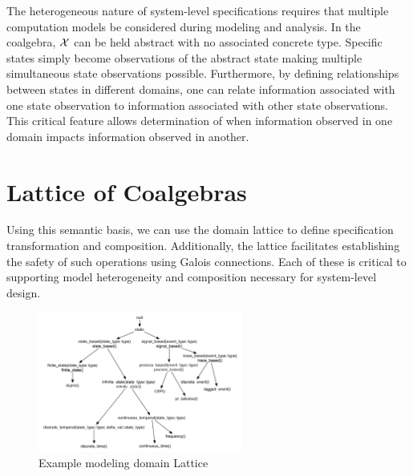 \documentclass[12pt]{article}
\begin{document}
The heterogeneous nature of system-level specifications requires that multiple computation
models be considered during modeling and analysis.  In the coalgebra, $\mathcal X$ can be
held abstract with no associated concrete type.  Specific states simply become
observations of the abstract state making multiple simultaneous state observations
possible.  Furthermore, by defining relationships between states in different domains, one
can relate information associated with one state observation to information associated
with other state observations.  This critical feature allows determination of when
information observed in one domain impacts information observed in another.

\section{Lattice of Coalgebras}

Using this semantic basis, we can use the domain lattice to define specification
transformation and composition.  Additionally, the lattice facilitates establishing the
safety of such operations using Galois connections.  Each of these is critical to
supporting model heterogeneity and composition necessary for system-level design.


\begin{figure}[hbtp]
  \centering
  \includegraphics[width=0.6\textwidth]{figures/semi-lattice-detailed.pdf}
  \caption{Example modeling domain Lattice}
  \label{fig:semi-lattice-detailed}
\end{figure}
\end{document}
